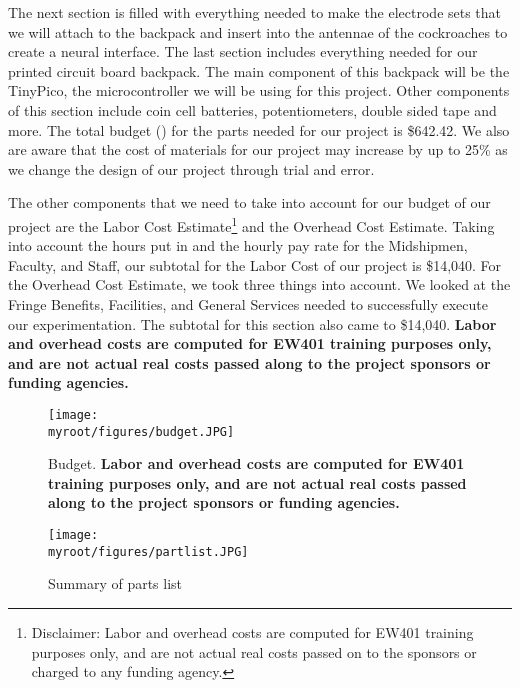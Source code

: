 \documentclass[twocolumn,10pt]{IEEEtran}
\newcommand{\myroot}{.}
\begin{document}
The next section is filled with everything needed to make the electrode sets that we will attach to the backpack and insert into the antennae of the cockroaches to create a neural interface. The last section includes everything needed for our printed circuit board backpack. The main component of this backpack will be the TinyPico, the microcontroller we will be using for this project. Other components of this section include coin cell batteries, potentiometers, double sided tape and more. The total budget () for the parts needed for our project is \$642.42. We also are aware that the cost of materials for our project may increase by up to 25\% as we change the design of our project through trial and error.

The other components that we need to take into account for our budget of our project are the Labor Cost Estimate\footnote{Disclaimer: Labor and overhead costs are computed for EW401 training purposes only, and are not actual real costs passed on to the sponsors or charged to any funding agency.} and the Overhead Cost Estimate. Taking into account the hours put in and the hourly pay rate for the Midshipmen, Faculty, and Staff, our subtotal for the Labor Cost of our project is \$14,040. For the Overhead Cost Estimate, we took three things into account. We looked at the Fringe Benefits, Facilities, and General Services needed to successfully execute our experimentation. The subtotal for this section also came to \$14,040. \textbf{Labor and overhead costs are computed for EW401 training purposes only, and are not actual real costs passed along to the project sponsors or funding agencies.}
\begin{figure}
\centering
\texttt{[image: \\myroot/figures/budget.JPG]}
\caption{Budget. \textbf{Labor and overhead costs are computed for EW401 training purposes only, and are not actual real costs passed along to the project sponsors or funding agencies.}}
\label{fig:budget}
\end{figure}
\begin{figure}
\texttt{[image: \\myroot/figures/partlist.JPG]}
\caption{Summary of parts list}
\label{fig:partlist}
\end{figure}
\end{document}
